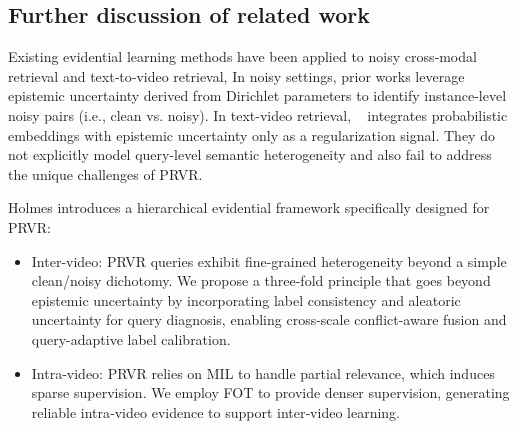 \subsection{Further discussion  of related work}
Existing evidential learning methods have been applied to noisy cross‑modal retrieval and text‑to‑video retrieval, In noisy settings, prior works\cite{decl,ucpm} leverage epistemic uncertainty derived from Dirichlet parameters to identify instance-level noisy pairs (i.e., clean vs. noisy). In text-video retrieval, ~\cite{duq} integrates probabilistic embeddings with epistemic uncertainty only as a regularization signal. They do not explicitly model query-level semantic heterogeneity and also fail to address the unique challenges of PRVR.

Holmes introduces a hierarchical evidential framework specifically designed for PRVR:
\begin{itemize}
    \item Inter-video: PRVR queries exhibit fine-grained heterogeneity beyond a simple clean/noisy dichotomy. We propose a three-fold principle that goes beyond epistemic uncertainty by incorporating label consistency and aleatoric uncertainty for query diagnosis, enabling cross-scale conflict-aware fusion and query-adaptive label calibration.
    \item  Intra-video: PRVR relies on MIL to handle partial relevance, which induces sparse supervision. We employ FOT to provide denser supervision, generating reliable intra‑video evidence to support inter‑video learning.
\end{itemize}
